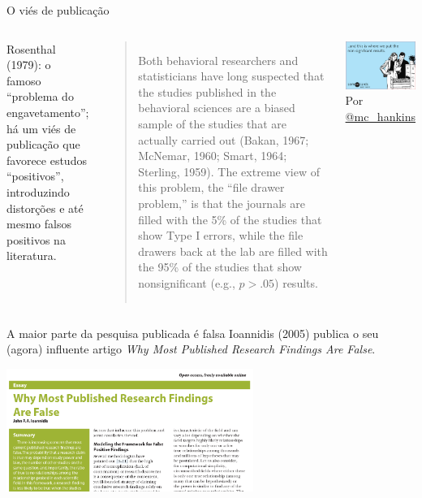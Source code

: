 \documentclass[numbering=fraction,aspectratio=169]{beamer}
\begin{document}
\begin{frame}{O viés de publicação}
  \begin{columns}
    Rosenthal (1979): o famoso \alert{“problema do engavetamento”}; há um \alert{viés de publicação} que favorece estudos “positivos”, introduzindo distorções e até mesmo falsos positivos na literatura.
    \medskip

    \begin{quote}
      \footnotesize
      Both behavioral researchers and statisticians have \alert<1->{long suspected that the studies published in the behavioral sciences are a biased sample of the studies that are actually carried out} (Bakan, 1967; McNemar, 1960; Smart, 1964; Sterling, 1959). The extreme view of this problem, the \alert<2->{“file drawer problem,”} is that the \alert<3->{journals are filled with the 5\% of the studies that show Type I errors}, while the file drawers back at the lab are filled with the 95\% of the studies that show nonsignificant (e.g., \(p > .05\)) results.
    \end{quote}
    \centering
    \includegraphics[width=\textwidth]{img/drawer}
    {\footnotesize Por \href{https://x.com/mc\_hankins}{@mc\_hankins}}
  \end{columns}
\end{frame}

\begin{frame}{A maior parte da pesquisa publicada é falsa}
  Ioannidis (2005) publica o seu (agora) influente artigo \emph{Why Most Published Research Findings Are False}.
  \medskip

  \centering
  \includegraphics[height=4cm]{img/ioannidis2005}
\end{frame}
\end{document}
